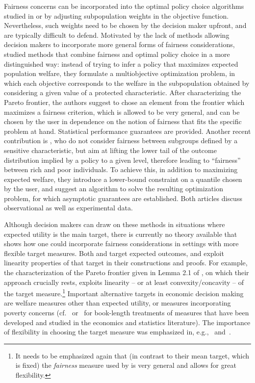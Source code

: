 \documentclass[11pt, a4paper]{article}
\theoremstyle{definition}
\begin{document}
Fairness concerns can be incorporated into the optimal policy choice algorithms studied in \cite{kitagawa2018should} or \cite{athey2017efficient} by adjusting subpopulation weights in the objective function. Nevertheless, such weights need to be chosen by the decision maker upfront, and are typically difficult to defend. Motivated by the lack of methods allowing decision makers to incorporate more general forms of fairness considerations, \cite{vivbra} studied methods that combine fairness and optimal policy choice in a more distinguished way: instead of trying to infer a policy that maximizes expected population welfare, they formulate a multiobjective optimization problem, in which each objective corresponds to the welfare in the subpopulation obtained by considering a given value of a protected characteristic. After characterizing the Pareto frontier, the authors suggest to chose an element from the frontier which maximizes a fairness criterion, which is allowed to be very general, and can be chosen by the user in dependence on the notion of fairness that fits the specific problem at hand. Statistical performance guarantees are provided. Another recent contribution is \cite{fang23}, who do not consider fairness between subgroups defined by a sensitive characteristic, but aim at lifting the lower tail of the outcome distribution implied by a policy to a given level, therefore leading to ``fairness'' between rich and poor individuals. To achieve this, in addition to maximizing expected welfare, they introduce a lower-bound constraint on a quantile chosen by the user, and suggest an algorithm to solve the resulting optimization problem, for which asymptotic guarantees are established. Both articles discuss observational as well as experimental data.

Although decision makers can draw on these methods in situations where expected utility is the main target, there is currently no theory available that shows how one could incorporate fairness considerations in settings with more flexible target measures. Both \cite{vivbra} and \cite{fang23} target expected outcomes, and exploit  linearity properties of that target in their constructions and proofs. For example, the characterization of the Pareto frontier given in Lemma 2.1 of \cite{vivbra}, on which their approach crucially rests, exploits linearity -- or at least convexity/concavity -- of the target measure.\footnote{It needs to be emphasized again that (in contrast to their mean target, which is fixed) the \emph{fairness} measure used by \cite{vivbra} is very general and allows for great flexibility.} Important alternative targets in economic decision making are welfare measures other than expected utility, or measures incorporating poverty concerns (cf.~\cite{cowell} or~\cite{chakravarty2009} for book-length treatments of measures that have been developed and studied in the economics and statistics literature). The importance of flexibility in choosing the target measure was emphasized in, e.g.,~\cite{bitler2006mean} and~\cite{rostek2010quantile}. 
\end{document}

